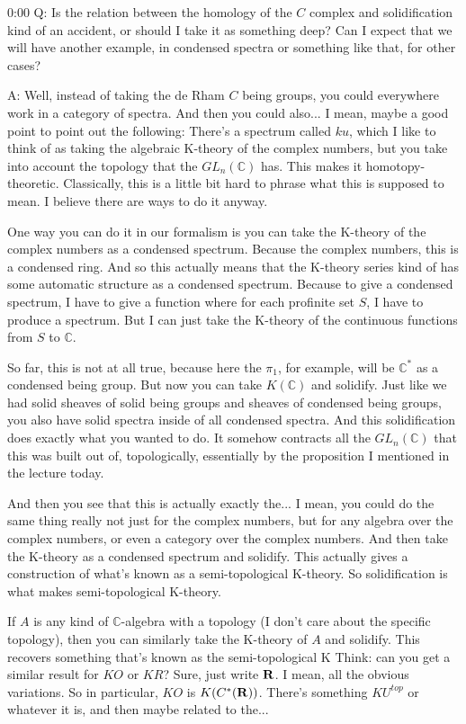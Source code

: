 \begin{unfinished}{0:00}
Q: Is the relation between the homology of the $C$ complex and solidification kind of an accident, or should I take it as something deep? Can I expect that we will have another example, in condensed spectra or something like that, for other cases?

A: Well, instead of taking the de Rham $C$ being groups, you could everywhere work in a category of spectra. And then you could also... I mean, maybe a good point to point out the following: There's a spectrum called $ku$, which I like to think of as taking the algebraic K-theory of the complex numbers, but you take into account the topology that the $GL_n(\mathbb{C})$ has. This makes it homotopy-theoretic. Classically, this is a little bit hard to phrase what this is supposed to mean. I believe there are ways to do it anyway.

One way you can do it in our formalism is you can take the K-theory of the complex numbers as a condensed spectrum. Because the complex numbers, this is a condensed ring. And so this actually means that the K-theory series kind of has some automatic structure as a condensed spectrum. Because to give a condensed spectrum, I have to give a function where for each profinite set $S$, I have to produce a spectrum. But I can just take the K-theory of the continuous functions from $S$ to $\mathbb{C}$.

So far, this is not at all true, because here the $\pi_1$, for example, will be $\mathbb{C}^*$ as a condensed being group. But now you can take $K(\mathbb{C})$ and solidify. Just like we had solid sheaves of solid being groups and sheaves of condensed being groups, you also have solid spectra inside of all condensed spectra. And this solidification does exactly what you wanted to do. It somehow contracts all the $GL_n(\mathbb{C})$ that this was built out of, topologically, essentially by the proposition I mentioned in the lecture today.

And then you see that this is actually exactly the... I mean, you could do the same thing really not just for the complex numbers, but for any algebra over the complex numbers, or even a category over the complex numbers. And then take the K-theory as a condensed spectrum and solidify. This actually gives a construction of what's known as a semi-topological K-theory. So solidification is what makes semi-topological K-theory.

If $A$ is any kind of $\mathbb{C}$-algebra with a topology (I don't care about the specific topology), then you can similarly take the K-theory of $A$ and solidify. This recovers something that's known as the semi-topological K
Think: can you get a similar result for $KO$ or $KR$? Sure, just write $\mathbf R$. I mean, all the obvious variations. So in particular, $KO$ is $K(C^*(\mathbf R))$. There's something $KU^{top}$ or whatever it is, and then maybe related to the...


\end{unfinished}
